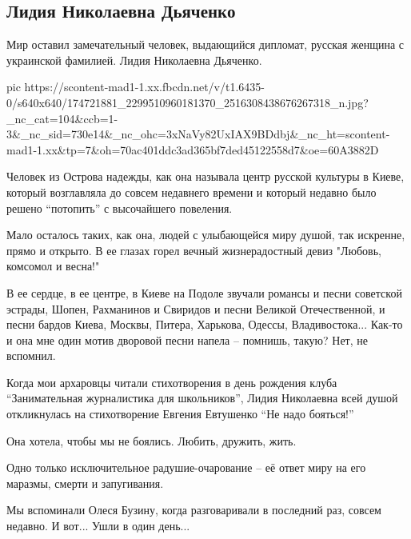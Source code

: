  
 
 
 
 
\subsection{Лидия Николаевна Дьяченко}

Мир оставил замечательный человек, выдающийся дипломат, русская женщина с украинской фамилией. Лидия Николаевна Дьяченко.

\ifcmt
  pic https://scontent-mad1-1.xx.fbcdn.net/v/t1.6435-0/s640x640/174721881_2299510960181370_2516308438676267318_n.jpg?_nc_cat=104&ccb=1-3&_nc_sid=730e14&_nc_ohc=3xNaVy82UxIAX9BDdbj&_nc_ht=scontent-mad1-1.xx&tp=7&oh=70ac401ddc3ad365bf7ded45122558d7&oe=60A3882D
\fi

Человек из Острова надежды, как она называла центр русской культуры в Киеве,
который возглавляла до совсем недавнего времени и который недавно было решено
\enquote{потопить} с высочайшего повеления.

Мало осталось таких, как она, людей с улыбающейся миру душой, так искренне,
прямо и открыто. В ее глазах горел вечный жизнерадостный девиз "Любовь,
комсомол и весна!" 

В ее сердце, в ее центре, в Киеве на Подоле звучали романсы и песни советской
эстрады, Шопен, Рахманинов и Свиридов и песни Великой Отечественной, и песни
бардов Киева, Москвы, Питера, Харькова, Одессы, Владивостока... Как-то и она
мне один мотив дворовой песни напела -- помнишь, такую? Нет, не вспомнил.

Когда мои архаровцы читали стихотворения в день рождения клуба \enquote{Занимательная
журналистика для школьников}, Лидия Николаевна всей душой откликнулась на
стихотворение Евгения Евтушенко \enquote{Не надо бояться!}

Она хотела, чтобы мы не боялись. Любить, дружить, жить.

Одно только исключительное радушие-очарование -- её ответ миру на его маразмы, смерти и запугивания. 

Мы вспоминали Олеся Бузину, когда разговаривали в последний раз, совсем недавно. И вот... Ушли в один день...     

